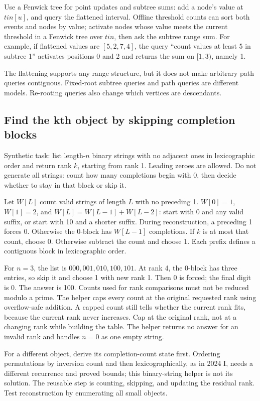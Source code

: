Use a Fenwick tree for point updates and subtree sums: add a node's value
at $tin[u]$, and query the flattened interval. Offline threshold counts
can sort both events and nodes by value; activate nodes whose value meets
the current threshold in a Fenwick tree over $tin$, then ask the subtree
range sum. For example, if flattened values are $[5,2,7,4]$, the query
``count values at least 5 in subtree 1'' activates positions 0 and 2 and
returns the sum on $[1,3)$, namely 1.

The flattening supports any range structure, but it does not make arbitrary
path queries contiguous. Fixed-root subtree queries and path queries are
different models. Re-rooting queries also change which vertices are descendants.

\subsection{Find the kth object by skipping completion blocks}
Synthetic task: list length-$n$ binary strings with no adjacent ones in
lexicographic order and return rank $k$, starting from rank 1. Leading zeroes
are allowed. Do not generate all strings: count how many completions begin
with 0, then decide whether to stay in that block or skip it.

Let $W[L]$ count valid strings of length $L$ with no preceding 1.
$W[0]=1$, $W[1]=2$, and $W[L]=W[L-1]+W[L-2]$: start with 0 and any
valid suffix, or start with 10 and a shorter suffix. During reconstruction,
a preceding 1 forces 0. Otherwise the 0-block has $W[L-1]$ completions.
If $k$ is at most that count, choose 0. Otherwise subtract the count and
choose 1. Each prefix defines a contiguous block in lexicographic order.

For $n=3$, the list is $000,001,010,100,101$. At rank 4, the 0-block has
three entries, so skip it and choose 1 with new rank 1. Then 0 is forced;
the final digit is 0. The answer is 100.
Counts used for rank comparisons must not be reduced modulo a prime. The
helper caps every count at the original requested rank using overflow-safe
addition. A capped count still tells whether the current rank fits, because
the current rank never increases. Cap at the original rank, not at a changing
rank while building the table. The helper returns no answer for an invalid
rank and handles $n=0$ as one empty string.

For a different object, derive its completion-count state first. Ordering
permutations by inversion count and then lexicographically, as in 2024 I,
needs a different recurrence and proved bounds; this binary-string helper
is not its solution. The reusable step is counting, skipping, and updating
the residual rank. Test reconstruction by enumerating all small objects.
